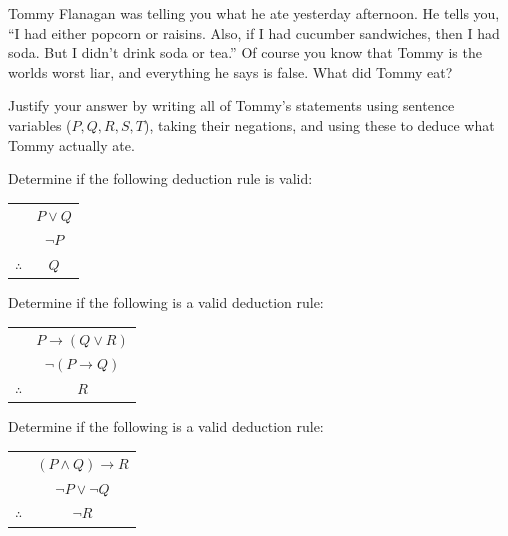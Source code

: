 \documentclass[10pt,]{book}
\theoremstyle{plain}
\theoremstyle{definition}
\theoremstyle{definition}
\theoremstyle{definition}
\theoremstyle{definition}
\numberwithin{equation}{chapter}
\newcommand{\hrulethin}  {\noalign{\hrule height 0.04em}}
\def\imp{\rightarrow}
\begin{document}
\begin{divisionexercise}{9}\hypertarget{exercise-228}{}
\hypertarget{p-1991}{}%
Tommy Flanagan was telling you what he ate yesterday afternoon. He tells you, ``I had either popcorn or raisins. Also, if I had cucumber sandwiches, then I had soda. But I didn't drink soda or tea.'' Of course you know that Tommy is the worlds worst liar, and everything he says is false. What did Tommy eat?%
\par
\hypertarget{p-1992}{}%
Justify your answer by writing all of Tommy's statements using sentence variables (\(P, Q, R, S, T\)), taking their negations, and using these to deduce what Tommy actually ate.%
\end{divisionexercise}%
\begin{divisionexercise}{10}\hypertarget{exercise-229}{}
\hypertarget{p-1993}{}%
Determine if the following deduction rule is valid:%
\begin{sidebyside}{1}{0}{0}{0}
\begin{sbspanel}{1}
{\centering%
\begin{tabular}{cc}
&\(P \vee Q\)\tabularnewline[0pt]
&\(\neg P\)\tabularnewline\hrulethin
\(\therefore\)&\(Q\)
\end{tabular}
\par}
\end{sbspanel}
\end{sidebyside}
\end{divisionexercise}%
\begin{divisionexercise}{11}\hypertarget{exercise-230}{}
\hypertarget{p-1995}{}%
Determine if the following is a valid deduction rule:%
\begin{sidebyside}{1}{0}{0}{0}
\begin{sbspanel}{1}
{\centering%
\begin{tabular}{cc}
&\(P \imp (Q \vee R)\)\tabularnewline[0pt]
&\(\neg(P \imp Q)\)\tabularnewline\hrulethin
\(\therefore\)&\(R\)
\end{tabular}
\par}
\end{sbspanel}
\end{sidebyside}
\end{divisionexercise}%
\begin{divisionexercise}{12}\hypertarget{exercise-231}{}
\hypertarget{p-1996}{}%
Determine if the following is a valid deduction rule:%
\begin{sidebyside}{1}{0}{0}{0}
\begin{sbspanel}{1}
{\centering%
\begin{tabular}{cc}
&\((P \wedge Q) \imp R\)\tabularnewline[0pt]
&\(\neg P \vee \neg Q\)\tabularnewline\hrulethin
\(\therefore\)&\(\neg R\)
\end{tabular}
\par}
\end{sbspanel}
\end{sidebyside}
\end{divisionexercise}%
\end{document}
